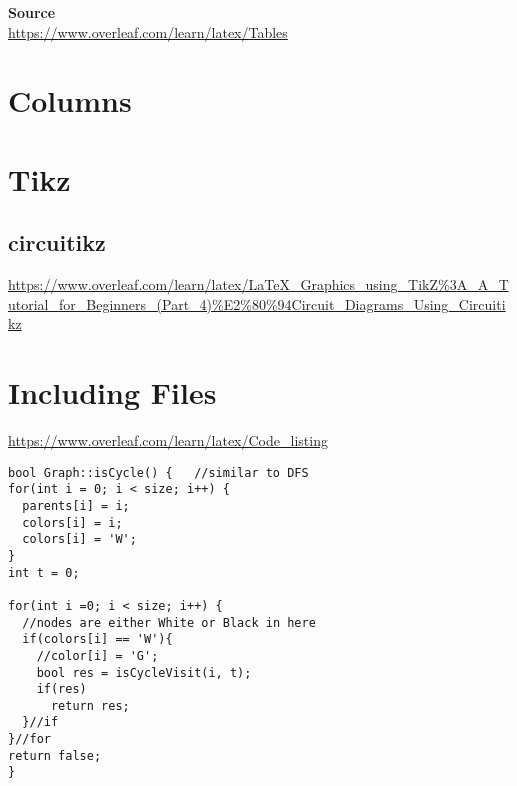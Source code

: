 \documentclass[10pt, letterpaper]{article}
\begin{document}
\noindent\textbf{Source}\\
\url{https://www.overleaf.com/learn/latex/Tables}


\section{Columns}


\section{Tikz}
\subsection{circuitikz}
\url{https://www.overleaf.com/learn/latex/LaTeX_Graphics_using_TikZ%3A_A_Tutorial_for_Beginners_(Part_4)%E2%80%94Circuit_Diagrams_Using_Circuitikz}


\section{Including Files}
\url{https://www.overleaf.com/learn/latex/Code_listing}
\lstset{style=basicstyle}
\begin{lstlisting}[title=Function: Graph::isCycle()]
bool Graph::isCycle() {   //similar to DFS
for(int i = 0; i < size; i++) {
  parents[i] = i;
  colors[i] = i;
  colors[i] = 'W';
}
int t = 0;

for(int i =0; i < size; i++) {
  //nodes are either White or Black in here
  if(colors[i] == 'W'){
    //color[i] = 'G';
    bool res = isCycleVisit(i, t);
    if(res)
      return res;
  }//if
}//for
return false;
}
\end{lstlisting}
\end{document}
